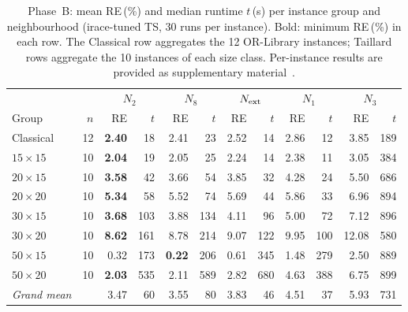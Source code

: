 \begin{table}[t]
\centering\small\setlength{\tabcolsep}{4pt}
\caption{Phase~B: mean RE\,(\%) and median runtime $t$\,(s) per instance group and
neighbourhood (irace-tuned TS, 30 runs per instance). Bold: minimum RE\,(\%) in each row.
The Classical row aggregates the 12 OR-Library instances; Taillard rows aggregate the
10 instances of each size class. Per-instance results are provided as supplementary
material~\cite{DiazSupp2026}.}
\label{tab:phaseb_groups}
\begin{tabular}{l r | rr | rr | rr | rr | rr}
\hline
 &  & \multicolumn{2}{c|}{$N_2$} & \multicolumn{2}{c|}{$N_8$} &
  \multicolumn{2}{c|}{$N_{\rm ext}$} & \multicolumn{2}{c|}{$N_1$} &
  \multicolumn{2}{c}{$N_3$} \\
Group & $n$ & RE & $t$ & RE & $t$ & RE & $t$ & RE & $t$ & RE & $t$ \\
\hline
Classical              & 12 & \textbf{2.40} & 18 & 2.41 & 23 & 2.52 & 14 & 2.86 & 12 & 3.85 & 189 \\
$15{\times}15$         & 10 & \textbf{2.04} & 19 & 2.05 & 25 & 2.24 & 14 & 2.38 & 11 & 3.05 & 384 \\
$20{\times}15$         & 10 & \textbf{3.58} & 42 & 3.66 & 54 & 3.85 & 32 & 4.28 & 24 & 5.50 & 686 \\
$20{\times}20$         & 10 & \textbf{5.34} & 58 & 5.52 & 74 & 5.69 & 44 & 5.86 & 33 & 6.96 & 894 \\
$30{\times}15$         & 10 & \textbf{3.68} & 103 & 3.88 & 134 & 4.11 & 96 & 5.00 & 72 & 7.12 & 896 \\
$30{\times}20$         & 10 & \textbf{8.62} & 161 & 8.78 & 214 & 9.07 & 122 & 9.95 & 100 & 12.08 & 580 \\
$50{\times}15$         & 10 & 0.32 & 173 & \textbf{0.22} & 206 & 0.61 & 345 & 1.48 & 279 & 2.50 & 889 \\
$50{\times}20$         & 10 & \textbf{2.03} & 535 & 2.11 & 589 & 2.82 & 680 & 4.63 & 388 & 6.75 & 899 \\
\hline
\textit{Grand mean}   &    & 3.47 & 60 & 3.55 & 80 & 3.83 & 46 & 4.51 & 37 & 5.93 & 731 \\
\hline
\end{tabular}
\end{table}
